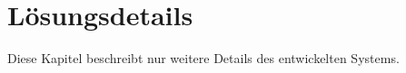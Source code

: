 \chapter{Lösungsdetails}
    \label{chapter:SolutionDetails}
    Diese Kapitel beschreibt nur weitere Details des entwickelten Systems.


    
    
    
    
    
    
    
    
    
